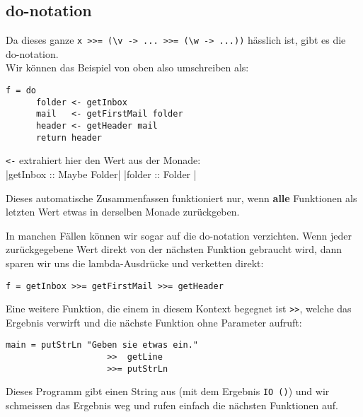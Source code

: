 \documentclass{beamer}
\begin{document}
\subsection{do-notation}
\begin{frame}[fragile]
Da dieses ganze \texttt{x >>= (\textbackslash v -> ... >>= (\textbackslash w -> ...))} hässlich ist, gibt es die do-notation.\\
Wir können das Beispiel von oben also umschreiben als:
\pause
\begin{verbatim}
f = do
      folder <- getInbox
      mail   <- getFirstMail folder
      header <- getHeader mail
      return header
\end{verbatim}
\pause
\texttt{<-} extrahiert hier den Wert \glqq aus der Monade\grqq :\\
|getInbox :: Maybe Folder|
|folder   :: Folder      |
\pause
\begin{important}Dieses automatische Zusammenfassen funktioniert nur, wenn \textbf{alle} Funktionen als letzten Wert etwas in derselben Monade zurückgeben.\end{important}
\end{frame}

\begin{frame}[fragile]
In manchen Fällen können wir sogar auf die do-notation verzichten. Wenn jeder zurückgegebene Wert direkt von der nächsten Funktion gebraucht wird, dann sparen wir uns die lambda-Ausdrücke und verketten direkt:
\pause
\begin{verbatim}
f = getInbox >>= getFirstMail >>= getHeader
\end{verbatim}
\pause
Eine weitere Funktion, die einem in diesem Kontext begegnet ist \texttt{>>}, welche das Ergebnis verwirft und die nächste Funktion ohne Parameter aufruft:
\begin{verbatim}
main = putStrLn "Geben sie etwas ein."
                    >>  getLine 
                    >>= putStrLn
\end{verbatim}
\pause
Dieses Programm gibt einen String aus (mit dem Ergebnis \texttt{IO ()}) und wir schmeissen das Ergebnis weg und rufen einfach die nächsten Funktionen auf.
\end{frame}
\end{document}
